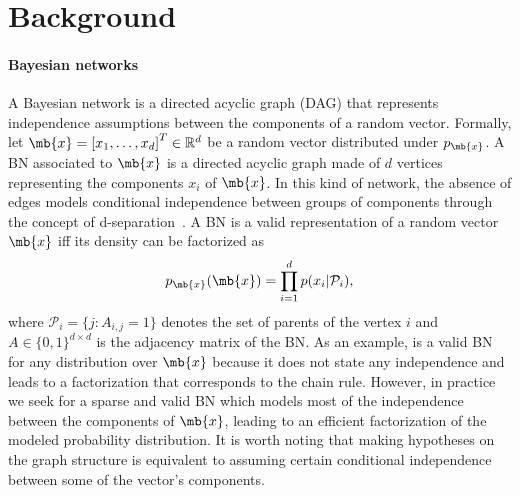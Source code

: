 \section{Background}

\paragraph{Bayesian networks}
A Bayesian network is a directed acyclic graph (DAG) that represents independence assumptions between the components of a random vector. Formally, let $\mb{x} = \left[x_1, \hdots, x_d\right]^T \in \mathbb{R}^d$ be a random vector distributed under $p_{\mb{x}}$. A BN associated to $\mb{x}$ is a directed acyclic graph made of $d$ vertices representing the components $x_i$ of $\mb{x}$. In this kind of network, the absence of edges models conditional independence between groups of components through the concept of d-separation~\citep{d-separation}. A BN is a valid representation of a random vector $\mb{x}$ iff its density can be factorized as
\begin{align}
    p_{\mb{x}}(\mb{x}) = \prod^d_{i=1}p(x_i|\mathcal{P}_i),\label{eq:BN-fact}
\end{align}
where  $\mathcal{P}_i = \{j: A_{i,j} = 1 \}$ denotes the set of parents of the vertex $i$ and $A \in \{0, 1\}^{d\times d}$ is the adjacency matrix of the BN. As an example,  is a valid BN for any distribution over $\mb{x}$ because it does not state any independence and leads to a factorization that corresponds to the chain rule. However, in practice we seek for a sparse and valid BN which models most of the independence between the components of $\mb{x}$, leading to an efficient factorization of the modeled probability distribution. It is worth noting that making hypotheses on the graph structure is equivalent to assuming certain conditional independence between some of the vector's components.



